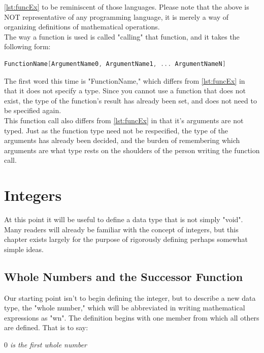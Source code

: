\ref{lst:funcEx} to be reminiscent of those languages. Please note that the above is NOT representative of any programming language, it is merely a way of organizing definitions of mathematical operations. \\
The way a function is used is called "calling" that function, and it takes the following form:
\begin{center}
\begin{lstlisting}[language=C, caption=Function Call Example, label=lst:funcCallEx]
FunctionName[ArgumentName0, ArgumentName1, ... ArgumentNameN]
\end{lstlisting}
\end{center}
The first word this time is "FunctionName," which differs from \ref{lst:funcEx} in that it does not specify a type. Since you cannot use a function that does not exist, the type of the function's result has already been set, and does not need to be specified again. \\
This function call also differs from \ref{lst:funcEx} in that it's arguments are not typed. Just as the function type need not be respecified, the type of the arguments has already been decided, and the burden of remembering which arguments are what type rests on the shoulders of the person writing the function call.

\section{Integers}
At this point it will be useful to define a data type that is not simply "void". Many readers will already be familiar with the concept of integers, but this chapter exists largely for the purpose of rigorously defining perhaps somewhat simple ideas. \\


\subsection{Whole Numbers and the Successor Function}
Our starting point isn't to begin defining the integer, but to describe a new data type, the "whole number," which will be abbreviated in writing mathematical expressions as "wn". The definition begins with one member from which all others are defined. That is to say:
\begin{center}
\textit{$0$ is the first whole number}
\end{center}

